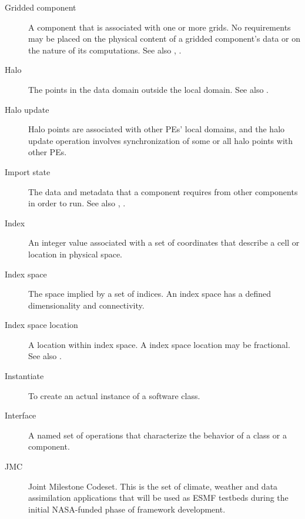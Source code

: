\begin{description}
\item[Gridded component] \label{glos:GridComp}
  A component that is associated with one or more grids.  No requirements 
  may be placed on the physical content of a gridded component's data or 
  on the nature of its computations. See also 
  , . 

\item[Halo] \label{glos:Halo} 
  The points in the data domain outside the local domain. 
  See also . %

\item[Halo update] \label{glos:HaloUpdate}
  Halo points are associated with other PEs'
  local domains, and the halo update operation involves
  synchronization of some or all halo points with other PEs. 

\item[Import state] \label{glos:ImportState} The data and metadata 
  that a component requires from other components in order to run.  
  See also , .

\item[Index] \label{glos:Index} An integer value associated with a set
  of coordinates that describe a cell or location in physical space.

\item[Index space] \label{glos:IndexSpace} The space implied 
  by a set of indices.  An index space has a defined dimensionality and 
  connectivity.

\item[Index space location] \label{glos:IndexSpaceloc} 
  A location within index space.  A index space location may be fractional.
  See also .

\item[Instantiate] \label{glos:Instantiate}
  To create an actual instance of a software class.

\item[Interface] \label{glos:Interface}
  A named set of operations that characterize the behavior of a class
  or a component.

\item[JMC] \label{glos:JMC} 
  Joint Milestone Codeset.  This is the set of climate, weather and
  data assimilation applications that will be used as ESMF testbeds 
  during the initial NASA-funded phase of framework development.


\end{description}
